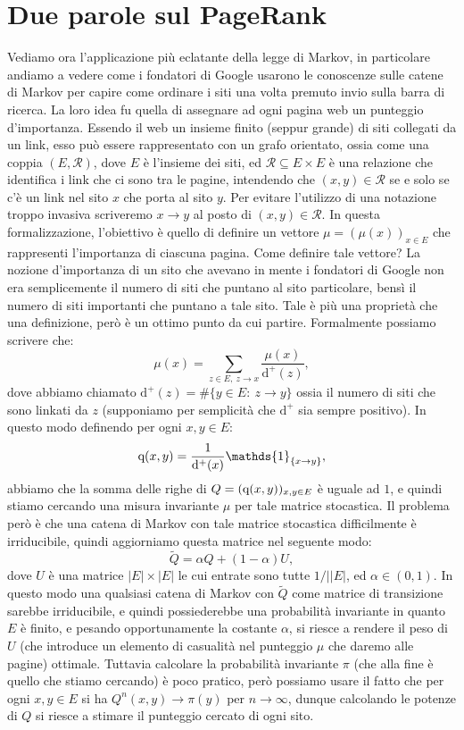 \documentclass[11pt]{book}
\theoremstyle{Definizione}
\theoremstyle{TeoremaProposizioneLemmaCorollario}
\theoremstyle{OsservazioneNota}
\renewcommand{\d}{\mathrm{d}}
\newcommand{\q}{\textup{q}}
\newcommand{\uno}[1]{\mathds{1}_{#1}}
\begin{document}
\section{Due parole sul PageRank}
Vediamo ora l'applicazione più eclatante della legge di Markov, in particolare andiamo a vedere come i fondatori di Google usarono le conoscenze sulle catene di Markov per capire come ordinare i siti una volta premuto invio sulla barra di ricerca. La loro idea fu quella di assegnare ad ogni pagina web un punteggio d'importanza. Essendo il web un insieme finito (seppur grande) di siti collegati da un link, esso può essere rappresentato con un grafo orientato, ossia come una coppia $(E,\mathcal{R})$, dove $E$ è l'insieme dei siti, ed $\mathcal{R}\subseteq E\times E$ è una relazione che identifica i link che ci sono tra le pagine, intendendo che $(x,y)\in \mathcal{R}$ se e solo se c'è un link nel sito $x$ che porta al sito $y$. Per evitare l'utilizzo di una notazione troppo invasiva scriveremo $x \to y$ al posto di $(x,y)\in \mathcal{R}$. In questa formalizzazione, l'obiettivo è quello di definire un vettore $\mu = (\mu(x))_{x\in E}$ che rappresenti l'importanza di ciascuna pagina. Come definire tale vettore? La nozione d'importanza di un sito che avevano in mente i fondatori di Google non era semplicemente il numero di siti che puntano al sito particolare, bensì il numero di siti importanti che puntano a tale sito. Tale è più una proprietà che una definizione, però è un ottimo punto da cui partire. Formalmente possiamo scrivere che:
$$
\mu(x) = \sum_{z\in E,\ z\to x} \frac{\mu(x)}{\d^+(z)},
$$
dove abbiamo chiamato $\d^+(z) = \#\{y\in E:\ z \to y\}$ ossia il numero di siti che sono linkati da $z$ (supponiamo per semplicità che $\d^+$ sia sempre positivo). In questo modo definendo per ogni $x,y\in E$:
$$
\q(x,y) = \frac{1}{\d^+(x)}\uno{\{x\to y\}},
$$
abbiamo che la somma delle righe di $Q = (\q(x,y))_{x,y\in E}$ è uguale ad $1$, e quindi stiamo cercando una misura invariante $\mu$ per tale matrice stocastica. Il problema però è che una catena di Markov con tale matrice stocastica difficilmente è irriducibile, quindi aggiorniamo questa matrice nel seguente modo:
$$
\widetilde{Q} = \alpha Q + (1-\alpha) U,
$$
dove $U$ è una matrice $|E|\times |E|$ le cui entrate sono tutte $1/||E|$, ed $\alpha\in (0,1)$. In questo modo una qualsiasi catena di Markov con $\widetilde{Q}$ come matrice di transizione sarebbe irriducibile, e quindi possiederebbe una probabilità invariante in quanto $E$ è finito, e pesando opportunamente la costante $\alpha$, si riesce a rendere il peso di $U$ (che introduce un elemento di casualità nel punteggio $\mu$ che daremo alle pagine) ottimale. Tuttavia calcolare la probabilità invariante $\pi$ (che alla fine è quello che stiamo cercando) è poco pratico, però possiamo usare il fatto che per ogni $x,y\in E$ si ha $Q^n(x,y) \to \pi(y)$ per $n\to \infty$, dunque calcolando le potenze di $Q$ si riesce a stimare il punteggio cercato di ogni sito.
\end{document}
